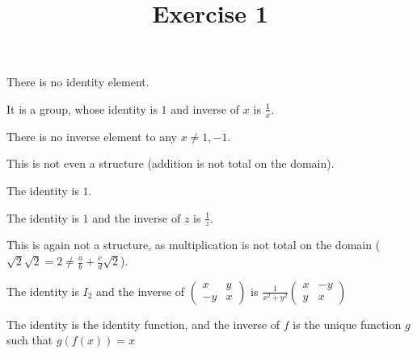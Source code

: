 

\usepackage{skak}
\usepackage{relsize}
\usepackage{graphicx}
\usepackage{mathtools}

\usepackage{textcomp}
\usepackage{bbding}

\usepackage{soul}

\newcommand{\flower}{\text{\scalebox{0.75}{\raisebox{-0.7ex}{
				\rotatebox{90}{\textleaf}\hspace{-0.3em}
				\scalebox{0.7}{\textleaf}\hspace{-1.35em}
				\raisebox{1ex}{\scalebox{0.8}{\FiveFlowerOpen}}
}}}}
\title{Exercise 1}

\maketitle
\begin{cExercise}[][][author][1]
	\begin{cPart}
		There is no identity element.
	\end{cPart}
	\begin{cPart}
		It is a group, whose identity is $1$ and inverse of $x$ is $\frac1x$.
	\end{cPart}
	\begin{cPart}
		There is no inverse element to any $x\ne 1,-1$.
	\end{cPart}
	\begin{cPart}
		This is not even a structure (addition is not total on the domain).
	\end{cPart}
	\begin{cPart}
		The identity is $1$.
	\end{cPart}
	\begin{cPart}
		The identity is $1$ and the inverse of $z$ is $\frac1z$.
	\end{cPart}
	\begin{cPart}
		This is again not a structure, as multiplication is not total on the domain ($\sqrt2\sqrt2=2\ne \frac ab+\frac cd\sqrt2$).
	\end{cPart}
	\begin{cPart}
		The identity is $I_2$ and the inverse of 
		$
		\begin{pmatrix}
			x & y\\
			-y & x
		\end{pmatrix}
		$ is $\frac1{x^2+y^2}
		\begin{pmatrix}
			x & -y\\
			y & x
		\end{pmatrix}
		$
	\end{cPart}
	\begin{cPart}
		The identity is the identity function, and the inverse of $f$ is the unique function $g$ such that $g(f(x))=x$
	\end{cPart}
\end{cExercise}

